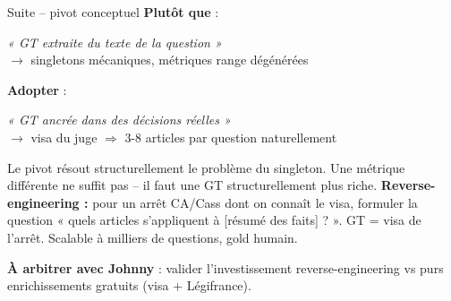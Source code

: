 \documentclass[aspectratio=169,10pt]{beamer}
\newcommand{\keybox}[1]{%
  \begin{center}
  \colorbox{accentsoft}{\parbox{0.92\linewidth}{\centering #1}}
  \end{center}}
\begin{document}
\begin{frame}{Suite -- pivot conceptuel}
  \footnotesize
  \textbf{Plutôt que} :
  \vspace{0.2em}
  \begin{center}
  \emph{« GT extraite du texte de la question »}\\
  $\to$ singletons mécaniques, métriques range dégénérées
  \end{center}

  \vspace{0.5em}
  \textbf{Adopter} :
  \begin{center}
  \emph{« GT ancrée dans des décisions réelles »}\\
  $\to$ visa du juge $\Rightarrow$ 3-8 articles par question naturellement
  \end{center}

  \vspace{0.8em}
  \keybox{Le pivot résout structurellement le problème du singleton.
  Une métrique différente ne suffit pas -- il faut une GT structurellement plus riche.
  \textbf{Reverse-engineering :} pour un arrêt CA/Cass dont on connaît le visa, formuler
  la question « quels articles s'appliquent à [résumé des faits] ? ».
  GT = visa de l'arrêt. Scalable à milliers de questions, gold humain.}

  \vspace{0.5em}
  \textbf{À arbitrer avec Johnny} : valider l'investissement reverse-engineering vs purs
  enrichissements gratuits (visa + Légifrance).
\end{frame}
\end{document}

